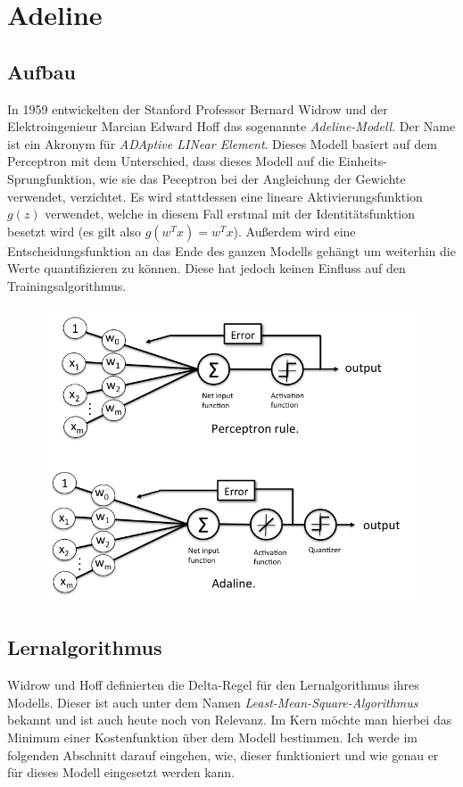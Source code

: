 \section{Adeline} \label{sc:adel}

\subsection{Aufbau}

In 1959 entwickelten der Stanford Professor Bernard Widrow und der Elektroingenieur Marcian Edward Hoff das sogenannte \emph{Adeline-Modell}. Der Name ist ein Akronym für \emph{ADAptive LINear Element}. Dieses Modell basiert auf dem Perceptron mit dem Unterschied, dass dieses Modell auf die Einheits-Sprungfunktion, wie sie das Peceptron bei der Angleichung der Gewichte verwendet, verzichtet. Es wird stattdessen eine lineare Aktivierungsfunktion ${g(z)}$ verwendet, welche in diesem Fall erstmal mit der Identitätsfunktion besetzt wird (es gilt also ${g(w^Tx) = w^Tx}$). Außerdem wird eine Entscheidungsfunktion an das Ende des ganzen Modells gehängt um weiterhin die Werte quantifizieren zu können. Diese hat jedoch keinen Einfluss auf den Trainingsalgorithmus. 

\begin{figure}[!htb]
	\centering
	\includegraphics[width=.8\linewidth]{img/adeline_aufbau}
	\label{fig:ad_aufbau}
\end{figure}


\subsection{Lernalgorithmus} \label{ss:la}

Widrow und Hoff definierten die Delta-Regel für den Lernalgorithmus ihres Modells. Dieser ist auch unter dem Namen \emph{Least-Mean-Square-Algorithmus} bekannt und ist auch heute noch von Relevanz. Im Kern möchte man hierbei das Minimum einer Kostenfunktion über dem Modell bestimmen. Ich werde im folgenden Abschnitt darauf eingehen, wie, dieser funktioniert und wie genau er für dieses Modell eingesetzt werden kann. 

